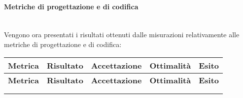 \paragraph{Metriche di progettazione e di codifica}\mbox{}\\
Vengono ora presentati i risultati ottenuti dalle misurazioni relativamente alle metriche di progettazione e di codifica:
\begin{longtable}{|m{5cm}|c|c|c|c|}
	\hline \multicolumn{1}{|c|}{\textbf{Metrica}} & \multicolumn{1}{c|}{\textbf{Risultato}} & \multicolumn{1}{c|}{\textbf{Accettazione}} & \multicolumn{1}{c|}{\textbf{Ottimalità}} & \multicolumn{1}{c|}{\textbf{Esito}}\\
	\hline 
	\endfirsthead
	
	\hline \multicolumn{1}{|c|}{\textbf{Metrica}} & \multicolumn{1}{c|}{\textbf{Risultato}} & \multicolumn{1}{c|}{\textbf{Accettazione}} & \multicolumn{1}{c|}{\textbf{Ottimalità}} & \multicolumn{1}{c|}{\textbf{Esito}}\\
	\hline 
	\endhead
	
	\hline \multicolumn{5}{|r|}{\ToBeContinued} \\ 
	\hline
	\endfoot
	
	\endlastfoot
	

\end{longtable}
